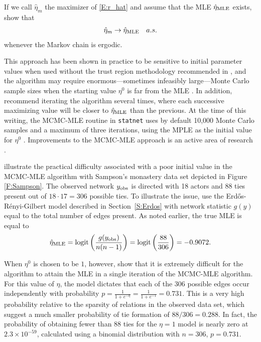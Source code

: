 If we call $\hat{\eta}_m$  the maximizer of \eqref{E:r_hat} and assume that the MLE 
$\hat{\eta}_{\textrm{MLE}}$ exists, \citeauthor{Geyer:1992} show that 
\begin{align*}
	\hat{\eta}_m \to \hat{\eta}_{\textrm{MLE}} \quad a.s.
\end{align*}
 whenever the Markov chain is ergodic. 
 
This approach has been shown in practice to be sensitive to initial parameter 
values when used without the trust region methodology recommended in \citep{Geyer:1992}, 
and the algorithm may require enormous---sometimes infeasibly large---Monte Carlo sample sizes 
when the starting value $\eta^0$ is far from the MLE \citep{ergm}.  
In addition, \citeauthor{Geyer:1992} recommend iterating the algorithm several times, 
where each successive maximizing value will be closer to $\hat{\eta}_{\textrm{MLE}}$ than the previous.  At the 
time of this writing, the MCMC-MLE routine in \texttt{statnet} uses by default 10,000 
Monte Carlo samples and a maximum of three iterations, using the 
MPLE as the initial value for $\eta^0$ \citep{statnet:R}.  
Improvements to the MCMC-MLE approach is an active area of research \citep*{Bartz,Hummel}.

\citet{ergm} illustrate the practical difficulty associated with a poor initial 
value in the MCMC-MLE algorithm with Sampson's monastery data set depicted in 
Figure \ref{F:Sampson}.  The 
observed network $y_{\textrm{obs}}$ is directed with 18 actors and 88 ties present out of $18 \cdot 17=306$ possible 
ties.  To illustrate the issue, \citeauthor{ergm} use the Erd\H{o}s-R\'{e}nyi-Gilbert model 
described in Section~\ref{S:Erdos} with network statistic $g(y)$ equal to the total number of 
edges present.  As noted earlier, the true MLE is equal to 
\begin{align*}
	\hat{\eta}_{\textrm{MLE}} = \operatorname{logit}\left( \frac{g(y_{\textrm{obs}})}{n(n-1)}\right) = \operatorname{logit} \left( \frac{88}{306}\right ) = -0.9072.
\end{align*}
  
When $\eta^0$ is chosen to be $1$, however, \citeauthor{ergm} show that it is
extremely difficult for the algorithm to attain the MLE in a single iteration of 
the MCMC-MLE algorithm.  
For this value of $\eta$, the model dictates that each of the 306 possible edges occur independently with probability $p = \frac{1}{1+e^{-\eta}} = \frac{1}{1+e^{-1}} = 0.731$.   
This is a very high probability relative to the sparsity of relations in the observed data 
set, which suggest a much smaller probability of tie formation of $88/306= 0.288$.  
In fact, the probability of obtaining fewer than 88 ties for the $\eta=1$ model is nearly zero at $2.3 \times 10^{-59}$, calculated using a binomial distribution with $n=306$, $p =0.731$.  

